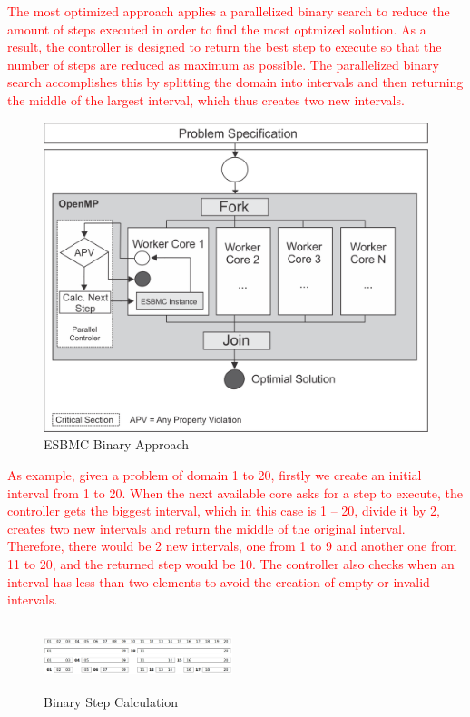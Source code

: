\textcolor{Red}{The most optimized approach applies a parallelized binary search to reduce the amount of steps executed  in order to find the most optmized solution. As a result, the controller is designed to return the best step to execute so that the number of steps are reduced as maximum as possible. The parallelized binary search accomplishes this by splitting the domain into intervals and then returning the middle of the largest interval, which thus creates two new intervals.}
\begin{figure}[ht]
	\centering
  \includegraphics[scale=0.75]{Image/esbmc-parallel-Controler.png} 
	\caption{ESBMC Binary Approach}
	\label{fig2}
\end{figure}

\textcolor{Red}{As example, given a problem of domain 1 to 20, firstly we create an initial interval from 1 to 20. When the next available core asks for a step to execute, the controller gets the biggest interval, which in this case is 1 – 20, divide it by 2, creates two new intervals and return the middle of the original interval. Therefore, there would be 2 new intervals, one from 1 to 9 and another one from 11 to 20, and the returned step would be 10. The controller also checks when an interval has less than two elements to avoid the creation of empty or invalid intervals. }
\begin{figure}[ht]
	\centering
  \includegraphics[width=0.49\textwidth, height=75px]{Image/Fig4.png}
	\caption{Binary Step Calculation}
	\label{fig2}
\end{figure}

